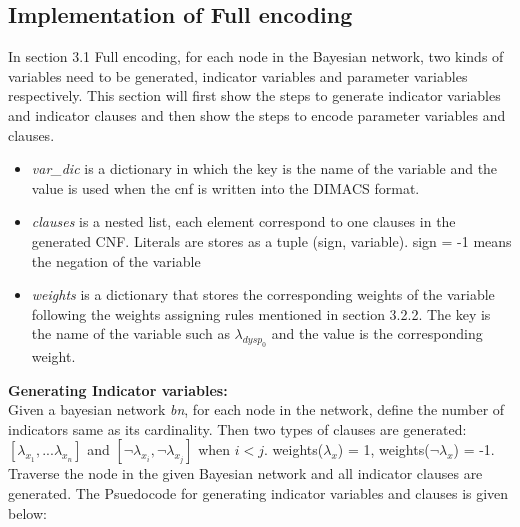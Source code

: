 \subsection{Implementation of Full encoding}
    In section 3.1 Full encoding, for each node in the Bayesian network, two kinds of variables need to be generated, indicator variables and parameter variables respectively. This section will first show the steps to generate indicator variables and indicator clauses and then show the steps to encode parameter variables and clauses.
    \begin{itemize}
        \item \textit{var\_dic} is a dictionary in which the key is the name of the variable and the value is used when the cnf is written into the DIMACS format. 
        \item \textit{clauses} is a nested list, each element correspond to one clauses in the generated CNF. Literals are stores as a tuple (sign, variable). sign = -1 means the negation of the variable
        \item \textit{weights} is a dictionary that stores the corresponding weights of the variable following the weights assigning rules mentioned in section 3.2.2. The key is the name of the variable such as $\lambda_{dysp_{0}}$ and the value is the corresponding weight.
    \end{itemize}
    \textbf{Generating Indicator variables:}\\
    Given a bayesian network \textit{bn}, for each node in the network, define the number of indicators same as its cardinality. Then two types of clauses are generated: $[\lambda_{x_{1}}, ... \lambda_{x_{n}}]$ and $[\neg \lambda_{x_{i}}, \neg \lambda_{x_{j}}]$ when $i < j$. weights($\lambda_{x}$) = 1, weights($\neg \lambda_{x}$) = -1. Traverse the node in the given Bayesian network and all indicator clauses are generated.
    The Psuedocode for generating indicator variables and clauses is given below:

